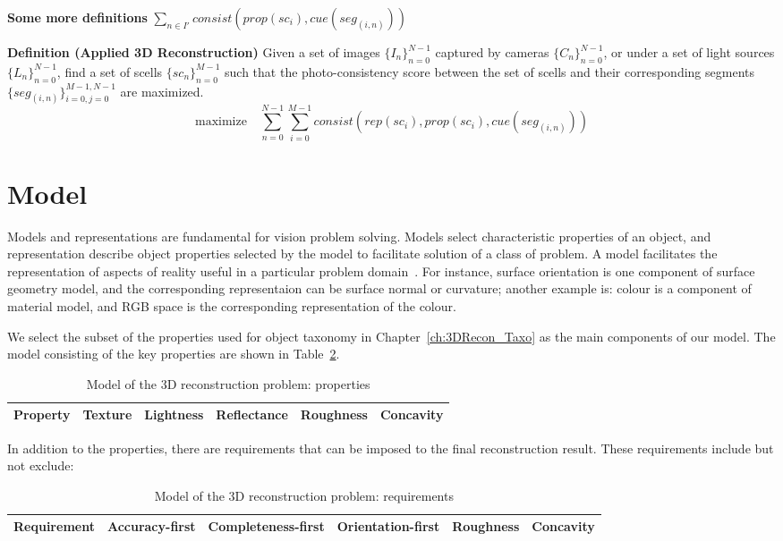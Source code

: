 \textbf{Some more definitions} $\sum_{n\in I'}consist(prop(sc_i), cue(seg_{(i, n)}))$

\textbf{Definition (Applied 3D Reconstruction)} Given a set of images $\{I_n\}_{n=0}^{N-1}$ captured by cameras $\{C_n\}_{n=0}^{N-1}$, or under a set of light sources $\{L_n\}_{n=0}^{N-1}$, find a set of scells $\{sc_n\}_{n=0}^{M-1}$ such that the photo-consistency score between the set of scells and their corresponding segments $\{seg_{(i, n)}\}_{i=0,j=0}^{M-1,N-1}$ are maximized.
$$
\mbox{maximize} \quad \sum_{n=0}^{N-1}\sum_{i=0}^{M-1} consist(rep(sc_i), prop(sc_i), cue(seg_{(i, n)}))
$$

\section{Model}
\label{sec:3DRecon_Model}
Models and representations are fundamental for vision problem solving. Models select characteristic properties of an object, and representation describe object properties selected by the model to facilitate solution of a class of problem. A model facilitates the representation of aspects of reality useful in a particular problem domain~\cite{bolles19863dpo}. For instance, surface orientation is one component of surface geometry model, and the corresponding representaion can be surface normal or curvature; another example is: colour is a component of material model, and RGB space is the corresponding representation of the colour.

We select the subset of the properties used for object taxonomy in Chapter~\ref{ch:3DRecon_Taxo} as the main components of our model. The model consisting of the key properties are shown in Table~\ref{tab:3DRecon_model}.
\begin{table}[h]
  \centering
  \begin{tabular}{l|*{5}{c}}
  \hline
  \textbf{Property} & Texture & Lightness & Reflectance & Roughness & Concavity\\
  \hline
  \end{tabular}
  \caption{Model of the 3D reconstruction problem: properties}
  \label{tab:3DRecon_model}
\end{table}

In addition to the properties, there are requirements that can be imposed to the final reconstruction result. These requirements include but not exclude:

\begin{table}[h]
  \centering
  \begin{tabular}{l|*{5}{c}}
  \hline
  \textbf{Requirement} & Accuracy-first & Completeness-first & Orientation-first & Roughness & Concavity\\
  \hline
  \end{tabular}
  \caption{Model of the 3D reconstruction problem: requirements}
  \label{tab:3DRecon_model}
\end{table}

